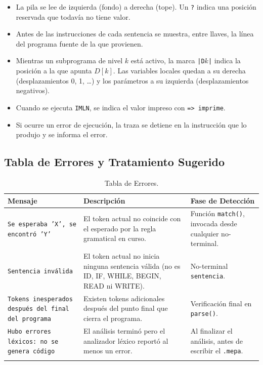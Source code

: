 \documentclass[12pt]{article}
\begin{document}
\begin{itemize}
    \item La pila se lee de izquierda (fondo) a derecha (tope). Un \texttt{?} indica una posición reservada que todavía no tiene valor.
    \item Antes de las instrucciones de cada sentencia se muestra, entre llaves, la línea del programa fuente de la que provienen.
    \item Mientras un subprograma de nivel $k$ está activo, la marca \texttt{|D$k$|} indica la posición a la que apunta $D[k]$. Las variables locales quedan a su derecha (desplazamientos 0, 1, \ldots) y los parámetros a su izquierda (desplazamientos negativos).
    \item Cuando se ejecuta \texttt{IMLN}, se indica el valor impreso con \texttt{=> imprime}.
    \item Si ocurre un error de ejecución, la traza se detiene en la instrucción que lo produjo y se informa el error.
\end{itemize}

\subsection{Tabla de Errores y Tratamiento Sugerido}

\begin{longtable}{|p{5.5cm}|p{5cm}|p{4.5cm}|}
\hline
\textbf{Mensaje} & \textbf{Descripción} & \textbf{Fase de Detección} \\
\hline
\endhead
\texttt{Se esperaba 'X', se encontró 'Y'} & El token actual no coincide con el esperado por la regla gramatical en curso. & Función \texttt{match()}, invocada desde cualquier no-terminal. \\
\hline
\texttt{Sentencia inválida} & El token actual no inicia ninguna sentencia válida (no es ID, IF, WHILE, BEGIN, READ ni WRITE). & No-terminal \texttt{sentencia}. \\
\hline
\texttt{Tokens inesperados después del final del programa} & Existen tokens adicionales después del punto final que cierra el programa. & Verificación final en \texttt{parse()}. \\
\hline
\texttt{Hubo errores léxicos: no se genera código} & El análisis terminó pero el analizador léxico reportó al menos un error. & Al finalizar el análisis, antes de escribir el \texttt{.mepa}. \\
\hline
\caption{Tabla de Errores.}
\label{tab:errores}
\end{longtable}
\end{document}
